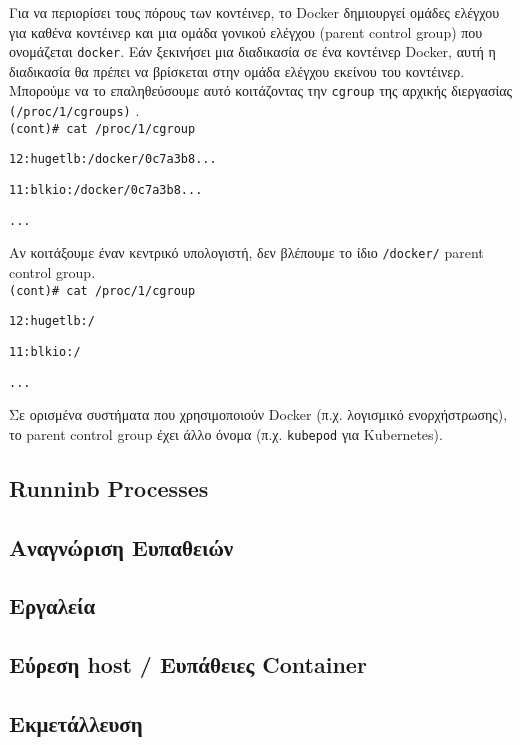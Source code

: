 Για να περιορίσει τους πόρους των κοντέινερ, το \textlatin{Docker} δημιουργεί
ομάδες ελέγχου για καθένα κοντέινερ και μια ομάδα γονικού ελέγχου
(\textlatin{parent control group}) που ονομάζεται \texttt{\textlatin{docker}}.
Εάν ξεκινήσει μια διαδικασία σε ένα κοντέινερ \textlatin{Docker}, αυτή η
διαδικασία θα πρέπει να βρίσκεται στην ομάδα ελέγχου εκείνου του κοντέινερ.
Μπορούμε να το επαληθεύσουμε αυτό κοιτάζοντας την \texttt{\textlatin{cgroup}}
της αρχικής διεργασίας \texttt{\textlatin{(/proc/1/cgroups)}}
\cite{Metasploit-Linux-Gather-Container-Detection}. \\

\texttt{\textlatin{(cont)\# cat /proc/1/cgroup}}

\texttt{\textlatin{12:hugetlb:/docker/0c7a3b8...}}

\texttt{\textlatin{11:blkio:/docker/0c7a3b8...}}

\texttt{\textlatin{...}}

Αν κοιτάξουμε έναν κεντρικό υπολογιστή, δεν βλέπουμε το ίδιο
\texttt{\textlatin{/docker/}} \textlatin{parent control group}. \\

\texttt{\textlatin{(cont)\# cat /proc/1/cgroup}}

\texttt{\textlatin{12:hugetlb:/}}

\texttt{\textlatin{11:blkio:/}}

\texttt{\textlatin{...}}

Σε ορισμένα συστήματα που χρησιμοποιούν \textlatin{Docker} (π.χ. λογισμικό
ενορχήστρωσης), το \textlatin{parent control group} έχει άλλο όνομα (π.χ.
\texttt{\textlatin{kubepod}} για \textlatin{Kubernetes}).

\subsection{\textlatin{Runninb Processes}}



\subsection{Αναγνώριση Ευπαθειών}
\subsection{Εργαλεία}
\subsection{Εύρεση \textlatin{host} / Ευπάθειες \textlatin{Container}}
\subsection{Εκμετάλλευση}
